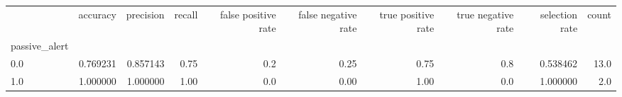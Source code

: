 \begin{tabular}{lrrrrrrrrr}
\toprule
{} &  accuracy &  precision &  recall &  false positive rate &  false negative rate &  true positive rate &  true negative rate &  selection rate &  count \\
passive\_alert &           &            &         &                      &                      &                     &                     &                 &        \\
\midrule
0.0           &  0.769231 &   0.857143 &    0.75 &                  0.2 &                 0.25 &                0.75 &                 0.8 &        0.538462 &   13.0 \\
1.0           &  1.000000 &   1.000000 &    1.00 &                  0.0 &                 0.00 &                1.00 &                 0.0 &        1.000000 &    2.0 \\
\bottomrule
\end{tabular}
